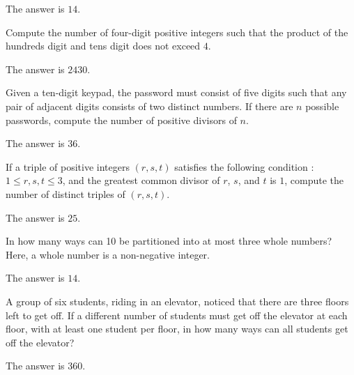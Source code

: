 \begin{solution}
The answer is $14$.
\end{solution}

\begin{problem}
Compute the number of four-digit positive integers such that the product of the hundreds digit and tens digit does not exceed $4$.
\end{problem}

\begin{solution}
The answer is $2430$.
\end{solution}

\begin{problem}
Given a ten-digit keypad, the password must consist of five digits such that any pair of adjacent digits consists of two distinct numbers. If there are $n$ possible passwords, compute the number of positive divisors of $n$.
\end{problem}

\begin{solution}
The answer is $36$.
\end{solution}

\begin{problem}
If a triple of positive integers $(r,s,t)$ satisfies the following condition : $1\leq r, s, t \leq 3$, and the greatest common divisor of $r$, $s$, and $t$ is $1$, compute the number of distinct triples of $(r,s,t)$.
\end{problem}

\begin{solution}
The answer is $25$.
\end{solution}

\begin{problem}
In how many ways can 10 be partitioned into at most three whole numbers? Here, a whole number is a non-negative integer.
\end{problem}

\begin{solution}
The answer is $14$.
\end{solution}

\begin{problem}
A group of six students, riding in an elevator, noticed that there are three floors left to get off. If a different number of students must get off the elevator at each floor, with at least one student per floor, in how many ways can all students get off the elevator?
\end{problem}

\begin{solution}
The answer is $360$.
\end{solution}

